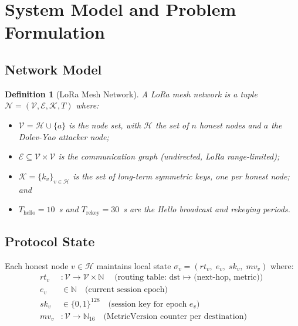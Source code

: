 \documentclass[10pt,journal,compsoc]{IEEEtran}
\newtheorem{definition}{Definition}
\begin{document}
\section{System Model and Problem Formulation}
\label{sec:model}

\subsection{Network Model}

\begin{definition}[LoRa Mesh Network]
A LoRa mesh network is a tuple $\mathcal{N} = (\mathcal{V}, \mathcal{E}, \mathcal{K}, T)$
where:
\begin{itemize}
  \item $\mathcal{V} = \mathcal{H} \cup \{a\}$ is the node set,
    with $\mathcal{H}$ the set of $n$ honest nodes and $a$ the
    Dolev-Yao attacker node;
  \item $\mathcal{E} \subseteq \mathcal{V} \times \mathcal{V}$ is
    the communication graph (undirected, LoRa range-limited);
  \item $\mathcal{K} = \{k_v\}_{v \in \mathcal{H}}$ is the set of
    long-term symmetric keys, one per honest node; and
  \item $T_{\text{hello}} = 10$~s and $T_{\text{rekey}} = 30$~s
    are the Hello broadcast and rekeying periods.
\end{itemize}
\end{definition}

\subsection{Protocol State}

Each honest node $v \in \mathcal{H}$ maintains local state
$\sigma_v = (rt_v,\; e_v,\; sk_v,\; mv_v)$ where:
\begin{align}
  rt_v &: \mathcal{V} \to \mathcal{V} \times \mathbb{N}
          \quad\text{(routing table: dst $\mapsto$ (next-hop, metric))} \\
  e_v  &\in \mathbb{N}
          \quad\text{(current session epoch)} \\
  sk_v &\in \{0,1\}^{128}
          \quad\text{(session key for epoch $e_v$)} \\
  mv_v &: \mathcal{V} \to \mathbb{N}_{16}
          \quad\text{(MetricVersion counter per destination)}
\end{align}
\end{document}
